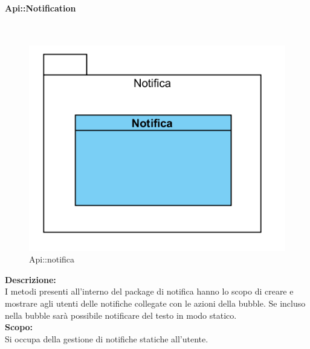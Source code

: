 \begin{samepage}
\paragraph{Api\-::Notification}\label{api-notifica}\mbox{}\\
\begin{figure}[H]
	\centering
	\includegraphics[width=14cm]{diagrammi_img/classi_e_package/api_notifica.png}
	\caption{Api\-::notifica}
\end{figure}
\end{samepage}
\textbf{Descrizione:}\\ 
I metodi presenti all'interno del package di notifica hanno lo scopo di creare e mostrare agli utenti delle notifiche collegate con le azioni della bubble. Se incluso nella bubble sarà possibile notificare del testo in modo statico.\\
\textbf{Scopo:}\\
Si occupa della gestione di notifiche statiche all'utente.\\

